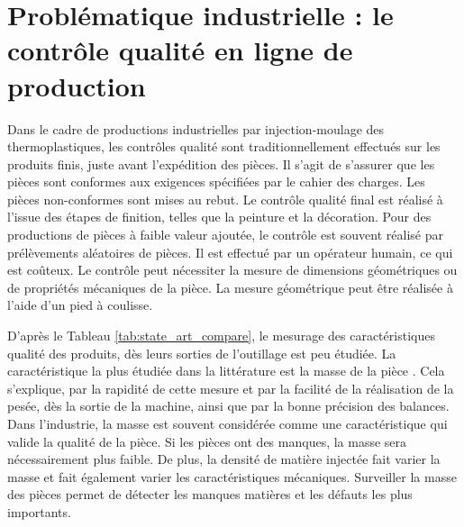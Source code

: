 
\section{Problématique industrielle : le contrôle qualité en ligne de production} \label{sec:research_objectives}

Dans le cadre de productions industrielles par injection-moulage des thermoplastiques, les contrôles qualité sont traditionnellement effectués sur les produits finis, juste avant l'expédition des pièces.
Il s'agit de s’assurer que les pièces sont conformes aux exigences spécifiées par le cahier des charges.
Les pièces non-conformes sont mises au rebut.
Le contrôle qualité final est réalisé à l’issue des étapes de finition, telles que la peinture et la décoration.
Pour des productions de pièces à faible valeur ajoutée, le contrôle est souvent réalisé par prélèvements aléatoires de pièces.
Il est effectué par un opérateur humain, ce qui est coûteux.
Le contrôle peut nécessiter la mesure de dimensions géométriques ou de propriétés mécaniques de la pièce.
La mesure géométrique peut être réalisée à l'aide d'un pied à coulisse.

D'après le Tableau \ref{tab:state_art_compare}, le mesurage des caractéristiques qualité des produits, dès leurs sorties de l'outillage est peu étudiée.
La caractéristique la plus étudiée dans la littérature est la masse de la pièce \cite{schnerr-haselbarth_automation_2000, fournier_conduite_2006, michaeli_online_2009}.
Cela s'explique, par la rapidité de cette mesure et par la facilité de la réalisation de la pesée, dès la sortie de la machine, ainsi que par la bonne précision des balances.
Dans l'industrie, la masse est souvent considérée comme une caractéristique qui valide la qualité de la pièce.
Si les pièces ont des manques, la masse sera nécessairement plus faible.
De plus, la densité de matière injectée fait varier la masse et fait également varier les caractéristiques mécaniques.
Surveiller la masse des pièces permet de détecter les manques matières et les défauts les plus importants.

